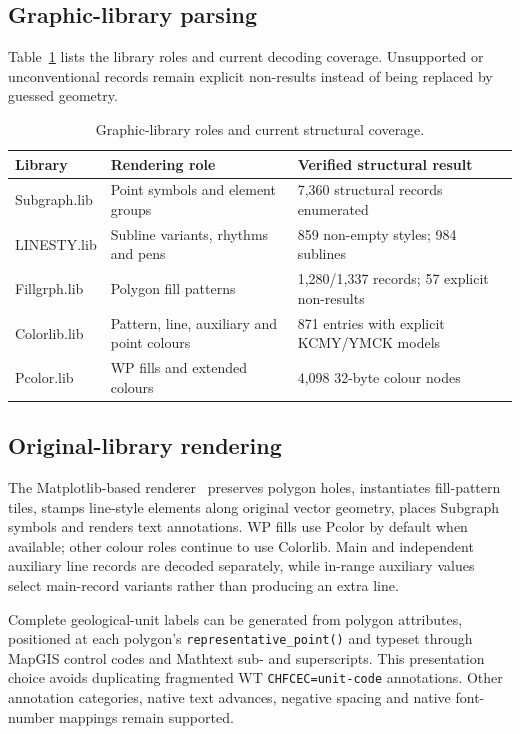 \documentclass[preprint,12pt,numbers]{elsarticle}
\begin{document}
\subsection{Graphic-library parsing}

Table~\ref{tab:libraries} lists the library roles and current decoding coverage. Unsupported or unconventional records remain explicit non-results instead of being replaced by guessed geometry.

\begin{table}[htbp]
\centering
\caption{Graphic-library roles and current structural coverage.}
\label{tab:libraries}
\small
\begin{tabularx}{\textwidth}{@{}llX@{}}
\toprule
Library & Rendering role & Verified structural result \\
\midrule
Subgraph.lib & Point symbols and element groups & 7{,}360 structural records enumerated \\
LINESTY.lib & Subline variants, rhythms and pens & 859 non-empty styles; 984 sublines \\
Fillgrph.lib & Polygon fill patterns & 1{,}280/1{,}337 records; 57 explicit non-results \\
Colorlib.lib & Pattern, line, auxiliary and point colours & 871 entries with explicit KCMY/YMCK models \\
Pcolor.lib & WP fills and extended colours & 4{,}098 32-byte colour nodes \\
\bottomrule
\end{tabularx}
\end{table}

\subsection{Original-library rendering}

The Matplotlib-based renderer~\cite{matplotlib} preserves polygon holes, instantiates fill-pattern tiles, stamps line-style elements along original vector geometry, places Subgraph symbols and renders text annotations. WP fills use Pcolor by default when available; other colour roles continue to use Colorlib. Main and independent auxiliary line records are decoded separately, while in-range auxiliary values select main-record variants rather than producing an extra line.

Complete geological-unit labels can be generated from polygon attributes, positioned at each polygon's \texttt{representative\_point()} and typeset through MapGIS control codes and Mathtext sub- and superscripts. This presentation choice avoids duplicating fragmented WT \texttt{CHFCEC=unit-code} annotations. Other annotation categories, native text advances, negative spacing and native font-number mappings remain supported.
\end{document}
